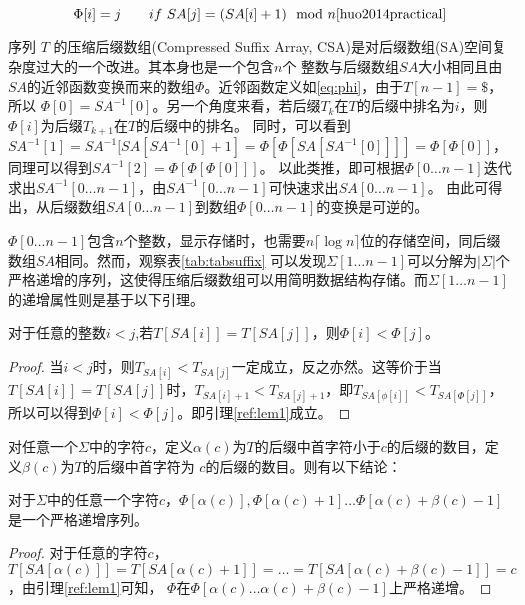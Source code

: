 \begin{equation}\label{eq:phi}
    \Phi [i] = j \qquad if\ SA[j] = (SA[i]+1)\mod n \cite{huo2014practical}
\end{equation}

序列 $T$ 的压缩后缀数组(Compressed Suffix Array, CSA)是对后缀数组(SA)空间复杂度过大的一个改进。其本身也是一个包含$n$个
整数与后缀数组$SA$大小相同且由$SA$的近邻函数变换而来的数组$\Phi$。近邻函数定义如\ref{eq:phi}，由于$T[n-1]=\$$，所以
$\Phi[0]=SA^{-1}[0]$。另一个角度来看，若后缀$T_k$在$T$的后缀中排名为$i$，则$\Phi[i]$为后缀$T_{k+1}$在$T$的后缀中的排名。
同时，可以看到$SA^{-1}[1]=SA^{-1}[SA[SA^{-1}[0]+1]=\Phi[\Phi[SA[SA^{-1}[0]]]]=\Phi[\Phi[0]]$，同理可以得到$SA^{-1}[2]=\Phi[\Phi[\Phi[0]]]$。
以此类推，即可根据$\Phi[0\ldots n-1]$迭代求出$SA^{-1}[0\ldots n-1]$，由$SA^{-1}[0\ldots n-1]$可快速求出$SA[0\ldots n-1]$。
由此可得出，从后缀数组$SA[0\ldots n-1]$到数组$\Phi[0\ldots n-1]$的变换是可逆的。

$\Phi[0\ldots n-1]$包含$n$个整数，显示存储时，也需要$n\lceil \log n \rceil$位的存储空间，同后缀数组$SA$相同。然而，观察表\ref{tab:tabsuffix}
可以发现$\Sigma[1\ldots n-1]$可以分解为$|\Sigma|$个严格递增的序列，这使得压缩后缀数组可以用简明数据结构存储。而$\Sigma[1\ldots n-1]$
的递增属性则是基于以下引理。

\begin{lem}\label{ref:lem1}
对于任意的整数$i<j$,若$T[SA[i]]=T[SA[j]]$，则$\Phi[i]<\Phi[j]$。
\end{lem}

\begin{proof}
    当$i<j$时，则$T_{SA[i]}<T_{SA[j]}$一定成立，反之亦然。这等价于当$T[SA[i]]=T[SA[j]]$时，$T_{SA[i]+1}<T_{SA[j]+1}$，即$T_{SA[\phi[i]]}<T_{SA[\Phi[j]]}$，
    所以可以得到$\Phi[i]<\Phi[j]$。即引理\ref{ref:lem1}成立。
\end{proof}

对任意一个$\Sigma$中的字符$c$，定义$\alpha(c)$为$T$的后缀中首字符小于$c$的后缀的数目，定义$\beta(c)$为$T$的后缀中首字符为
$c$的后缀的数目。则有以下结论：

\begin{cor}\label{cor1}
对于$\Sigma$中的任意一个字符$c$，$\Phi[\alpha(c)], \Phi[\alpha(c)+1] \ldots \Phi[\alpha(c)+\beta(c)− 1]$是一个严格递增序列。
\end{cor}

\begin{proof}
    对于任意的字符$c$，$T[SA[\alpha(c)]]=T[SA[\alpha(c)+1]]=\ldots =T[SA[\alpha(c)+\beta(c)-1]]=c$，由引理\ref{ref:lem1}可知，
    $\Phi$在$\Phi[\alpha(c)\ldots \alpha(c)+\beta(c)-1]$上严格递增。
\end{proof}

